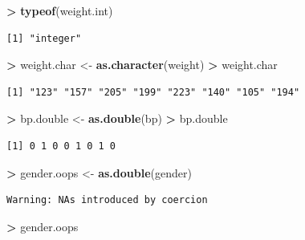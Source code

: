 \documentclass[
]{krantz}
\makeatletter
\newenvironment{Shaded}{\begin{snugshade}}{\end{snugshade}}
\newcommand{\KeywordTok}[1]{\textcolor[rgb]{0.27,0.27,0.27}{\textbf{#1}}}
\newcommand{\NormalTok}[1]{#1}
\newcommand{\OperatorTok}[1]{\textcolor[rgb]{0.43,0.43,0.43}{\textbf{#1}}}
\newcommand{\StringTok}[1]{\textcolor[rgb]{0.5,0.5,0.5}{#1}}
\newenvironment{kframe}{%
\medskip{}
\setlength{\fboxsep}{.8em}
 \def\at@end@of@kframe{}%
 \ifinner\ifhmode%
  \def\at@end@of@kframe{\end{minipage}}%
  \begin{minipage}{\columnwidth}%
 \fi\fi%
 \def\FrameCommand##1{\hskip\@totalleftmargin \hskip-\fboxsep
 \colorbox{shadecolor}{##1}\hskip-\fboxsep
     \hskip-\linewidth \hskip-\@totalleftmargin \hskip\columnwidth}%
 \MakeFramed {\advance\hsize-\width
   \@totalleftmargin\z@ \linewidth\hsize
   \@setminipage}}%
 {\par\unskip\endMakeFramed%
 \at@end@of@kframe}
\renewenvironment{Shaded}{\begin{kframe}}{\end{kframe}}
\makeatother
\begin{document}
\begin{Shaded}
\begin{Highlighting}[]
\OperatorTok{\textgreater{}}\StringTok{ }\KeywordTok{typeof}\NormalTok{(weight.int)}
\end{Highlighting}
\end{Shaded}

\begin{verbatim}
[1] "integer"
\end{verbatim}

\begin{Shaded}
\begin{Highlighting}[]
\OperatorTok{\textgreater{}}\StringTok{ }\NormalTok{weight.char \textless{}{-}}\StringTok{ }\KeywordTok{as.character}\NormalTok{(weight)}
\OperatorTok{\textgreater{}}\StringTok{ }\NormalTok{weight.char}
\end{Highlighting}
\end{Shaded}

\begin{verbatim}
[1] "123" "157" "205" "199" "223" "140" "105" "194"
\end{verbatim}

\begin{Shaded}
\begin{Highlighting}[]
\OperatorTok{\textgreater{}}\StringTok{ }\NormalTok{bp.double \textless{}{-}}\StringTok{ }\KeywordTok{as.double}\NormalTok{(bp)}
\OperatorTok{\textgreater{}}\StringTok{ }\NormalTok{bp.double}
\end{Highlighting}
\end{Shaded}

\begin{verbatim}
[1] 0 1 0 0 1 0 1 0
\end{verbatim}

\begin{Shaded}
\begin{Highlighting}[]
\OperatorTok{\textgreater{}}\StringTok{ }\NormalTok{gender.oops \textless{}{-}}\StringTok{ }\KeywordTok{as.double}\NormalTok{(gender)}
\end{Highlighting}
\end{Shaded}

\begin{verbatim}
Warning: NAs introduced by coercion
\end{verbatim}

\begin{Shaded}
\begin{Highlighting}[]
\OperatorTok{\textgreater{}}\StringTok{ }\NormalTok{gender.oops}
\end{Highlighting}
\end{Shaded}
\end{document}
